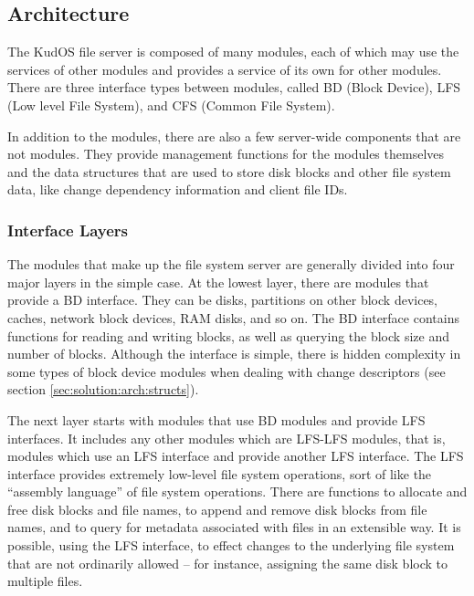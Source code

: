 \subsection{Architecture}
\label{sec:solution:arch}

The KudOS file server is composed of many modules, each of which may use the
services of other modules and provides a service of its own for other modules.
There are three interface types between modules, called BD (Block Device), LFS
(Low level File System), and CFS (Common File System).

In addition to the modules, there are also a few server-wide components that are
not modules. They provide management functions for the modules themselves and
the data structures that are used to store disk blocks and other file system
data, like change dependency information and client file IDs.

\subsubsection{Interface Layers}
\label{sec:solution:arch:layers}

The modules that make up the file system server are generally divided into four
major layers in the simple case. At the lowest layer, there are modules that
provide a BD interface. They can be disks, partitions on other block devices,
caches, network block devices, RAM disks, and so on. The BD interface contains
functions for reading and writing blocks, as well as querying the block size and
number of blocks. Although the interface is simple, there is hidden complexity
in some types of block device modules when dealing with change descriptors (see
section \ref{sec:solution:arch:structs}).

The next layer starts with modules that use BD modules and provide LFS
interfaces. It includes any other modules which are LFS-LFS modules, that is,
modules which use an LFS interface and provide another LFS interface. The LFS
interface provides extremely low-level file system operations, sort of like the
``assembly language'' of file system operations. There are functions to allocate
and free disk blocks and file names, to append and remove disk blocks from file
names, and to query for metadata associated with files in an extensible way. It
is possible, using the LFS interface, to effect changes to the underlying
file system that are not ordinarily allowed -- for instance, assigning the same
disk block to multiple files.

